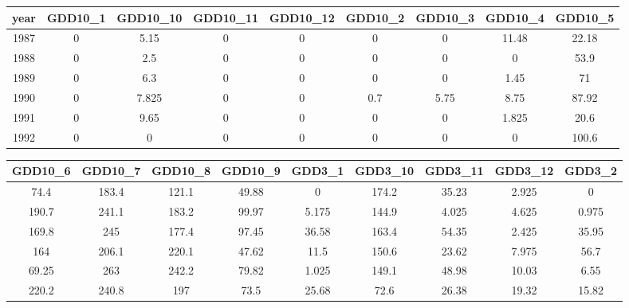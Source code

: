 \documentclass[10pt,]{article}
\newenvironment{Shaded}{\begin{snugshade}}{\end{snugshade}}
\newcommand{\KeywordTok}[1]{\textcolor[rgb]{0.13,0.29,0.53}{\textbf{#1}}}
\newcommand{\DataTypeTok}[1]{\textcolor[rgb]{0.13,0.29,0.53}{#1}}
\newcommand{\DecValTok}[1]{\textcolor[rgb]{0.00,0.00,0.81}{#1}}
\newcommand{\StringTok}[1]{\textcolor[rgb]{0.31,0.60,0.02}{#1}}
\newcommand{\CommentTok}[1]{\textcolor[rgb]{0.56,0.35,0.01}{\textit{#1}}}
\newcommand{\OperatorTok}[1]{\textcolor[rgb]{0.81,0.36,0.00}{\textbf{#1}}}
\newcommand{\NormalTok}[1]{#1}
\begin{document}
\begin{Shaded}
\end{Shaded}

\begin{longtable}[]{@{}ccccccccc@{}}
\toprule
year & GDD10\_1 & GDD10\_10 & GDD10\_11 & GDD10\_12 & GDD10\_2 &
GDD10\_3 & GDD10\_4 & GDD10\_5\tabularnewline
\midrule
\endhead
1987 & 0 & 5.15 & 0 & 0 & 0 & 0 & 11.48 & 22.18\tabularnewline
1988 & 0 & 2.5 & 0 & 0 & 0 & 0 & 0 & 53.9\tabularnewline
1989 & 0 & 6.3 & 0 & 0 & 0 & 0 & 1.45 & 71\tabularnewline
1990 & 0 & 7.825 & 0 & 0 & 0.7 & 5.75 & 8.75 & 87.92\tabularnewline
1991 & 0 & 9.65 & 0 & 0 & 0 & 0 & 1.825 & 20.6\tabularnewline
1992 & 0 & 0 & 0 & 0 & 0 & 0 & 0 & 100.6\tabularnewline
\bottomrule
\end{longtable}

\begin{longtable}[]{@{}ccccccccc@{}}
\toprule
GDD10\_6 & GDD10\_7 & GDD10\_8 & GDD10\_9 & GDD3\_1 & GDD3\_10 &
GDD3\_11 & GDD3\_12 & GDD3\_2\tabularnewline
\midrule
\endhead
74.4 & 183.4 & 121.1 & 49.88 & 0 & 174.2 & 35.23 & 2.925 &
0\tabularnewline
190.7 & 241.1 & 183.2 & 99.97 & 5.175 & 144.9 & 4.025 & 4.625 &
0.975\tabularnewline
169.8 & 245 & 177.4 & 97.45 & 36.58 & 163.4 & 54.35 & 2.425 &
35.95\tabularnewline
164 & 206.1 & 220.1 & 47.62 & 11.5 & 150.6 & 23.62 & 7.975 &
56.7\tabularnewline
69.25 & 263 & 242.2 & 79.82 & 1.025 & 149.1 & 48.98 & 10.03 &
6.55\tabularnewline
220.2 & 240.8 & 197 & 73.5 & 25.68 & 72.6 & 26.38 & 19.32 &
15.82\tabularnewline
\bottomrule
\end{longtable}
\end{document}
